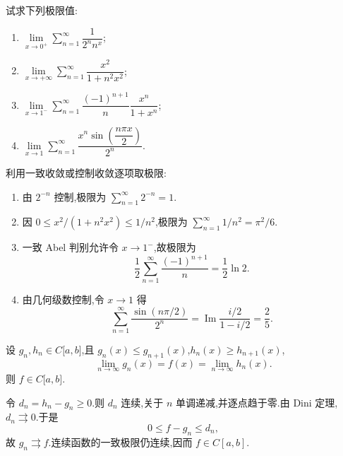 \begin{example}
    试求下列极限值:
    \begin{enumerate}
        \item $\displaystyle\lim\limits_{x\to0^+}\sum\limits_{n=1}^{\infty}\dfrac{1}{2^n n^x}$;
        \item $\displaystyle\lim\limits_{x\to+\infty}\sum\limits_{n=1}^{\infty}\dfrac{x^2}{1+n^2x^2}$;
        \item $\displaystyle\lim\limits_{x\to1^-}\sum\limits_{n=1}^{\infty}\dfrac{(-1)^{n+1}}{n}\dfrac{x^n}{1+x^n}$;
        \item $\displaystyle\lim\limits_{x\to1}\sum\limits_{n=1}^{\infty}\dfrac{x^n\sin\left(\dfrac{n\pi x}{2}\right)}{2^n}$.
    \end{enumerate}
\end{example}
\exampleblank

\begin{solution}
    利用一致收敛或控制收敛逐项取极限:
    \begin{enumerate}
        \item 由 $2^{-n}$ 控制,极限为 $\displaystyle\sum_{n=1}^{\infty}2^{-n}=\boxed1$.
        \item 因 $0\leq x^2/(1+n^2x^2)\leq1/n^2$,极限为
              $\displaystyle\sum_{n=1}^{\infty}1/n^2=\boxed{\pi^2/6}$.
        \item 一致 Abel 判别允许令 $x\to1^-$,故极限为
              \[
                  \dfrac{1}{2}\sum\limits_{n=1}^{\infty}\dfrac{(-1)^{n+1}}n
                  =\boxed{\dfrac{1}{2}\ln2}.
              \]
        \item 由几何级数控制,令 $x\to1$ 得
              \[
                  \displaystyle\sum\limits_{n=1}^{\infty}\dfrac{\sin(n\pi/2)}{2^n}
                  =\operatorname{Im}\dfrac{i/2}{1-i/2}
                  =\boxed{\dfrac{2}{5}}.
              \]
    \end{enumerate}
\end{solution}

\begin{example}
    设 $g_n,h_n\in C\lbrack a,b\rbrack$,且 $g_n(x)\leq g_{n+1}(x)$,$h_n(x)\geq h_{n+1}(x)$,
    \[
        \displaystyle\lim\limits_{n\to\infty}g_n(x)=f(x)=\lim\limits_{n\to\infty}h_n(x).
    \]
    则 $f\in C\lbrack a,b\rbrack$.
\end{example}
\exampleblank

\begin{solution}
    令 $d_n=h_n-g_n\geq0$.则 $d_n$ 连续,关于 $n$ 单调递减,并逐点趋于零.由 Dini 定理,$d_n\rightrightarrows0$.于是
    \[
        0\leq f-g_n\leq d_n,
    \]
    故 $g_n\rightrightarrows f$.连续函数的一致极限仍连续,因而 $f\in C[a,b]$.
\end{solution}

